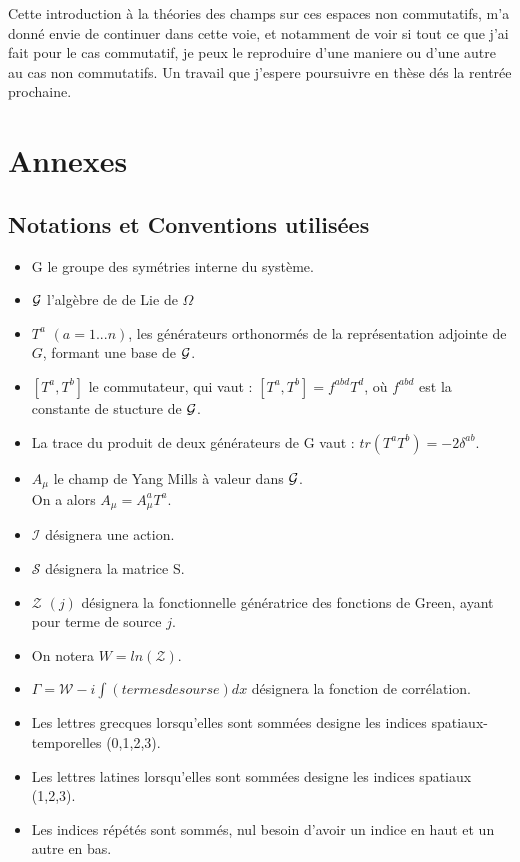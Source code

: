 \documentclass[a4paper,11pt]{article}
\theoremstyle{plain}
\theoremstyle{definition}
\theoremstyle{remark}
\numberwithin{equation}{section}
\numberwithin{equation}{subsection}
\numberwithin{figure}{section}
\begin{document}
Cette introduction à la théories des champs sur ces espaces non commutatifs, m'a donné envie de continuer dans cette voie, et notamment de voir 
si tout ce que j'ai fait pour le cas commutatif, je peux le reproduire d'une maniere ou d'une autre au cas non commutatifs. Un travail que j'espere 
poursuivre en thèse dés la rentrée prochaine. 

\section{Annexes}

\subsection{Notations et Conventions utilisées}

\begin{itemize}
 \renewcommand{\labelitemi}{$\cdot$}
 \item G le groupe des symétries interne du système.
 \item $\cal{G}$ l'algèbre de de Lie de $\Omega$
 \item $T^{a}$ $(a=1...n)$, les générateurs orthonormés de la représentation adjointe de $G$, formant une base de $\cal{G}$.
 \item $[T^{a},T^{b}]$ le commutateur, qui vaut : $[T^{a},T^{b}]= f^{abd}T^{d}$, où $f^{abd}$ est la constante de stucture de $\cal{G}$.
 \item La trace du produit de deux générateurs de G vaut : $tr\left(T^{a}T^{b}\right)=-2\delta^{ab}$. 
 \item $A_{\mu}$ le champ de Yang Mills à valeur dans $\cal{G}$.\\ On a alors $A_{\mu}=A_{\mu}^{a} T^{a}$.
 \item $\mathcal{I}$ désignera une action.
 \item $\mathcal{S}$ désignera la matrice S.
 \item $\mathcal{Z}$ $(j)$ désignera la fonctionnelle génératrice des fonctions de Green, ayant pour terme de source $j$.
 \item On notera $W = ln(\mathcal{Z}) $.
 \item $\Gamma = \mathcal{W} - i \int (termes de sourse) dx $ désignera la fonction de corrélation.
 \item Les lettres grecques lorsqu'elles sont sommées designe les indices spatiaux-temporelles (0,1,2,3).
 \item Les lettres latines lorsqu'elles sont sommées designe les indices spatiaux (1,2,3).
 \item Les indices répétés sont sommés, nul besoin d'avoir un indice en haut et un autre en bas.
\end{itemize}
\end{document}
